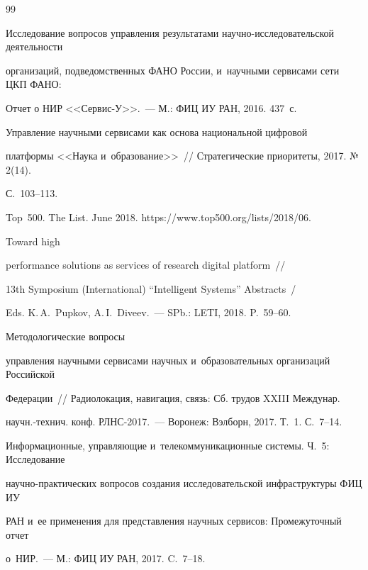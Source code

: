 {{\begin{thebibliography}{99}

Исследование вопросов управления результатами научно-исследовательской деятельности 

организаций, подведомственных ФАНО России, и~научными сервисами сети ЦКП ФАНО: 

Отчет о НИР <<Сервис-У>>.~--- М.: ФИЦ ИУ РАН, 2016. 437~с.


 Управление научными сервисами как основа национальной цифровой 

платформы <<Наука и~образование>>~/\!\!/ Стратегические приоритеты, 2017. №\,2(14). 

С.~103--113.


Top~500. The List. June 2018. {\sf https://www.top500.org/lists/2018/06}.


 Toward high 

performance solutions as services of research digital platform~/\!\!/ 

13th Symposium (International) ``Intelligent Systems'' Abstracts~/

Eds. K.\,A.~Pupkov, A.\,I.~Diveev.~--- SPb.: LETI, 2018.  P.~59--60.






 Методологические вопросы 

управления научными сервисами научных и~образовательных организаций Российской 

Федерации~/\!\!/ Радиолокация, навигация, связь: Сб. трудов XXIII Междунар.  

научн.-технич. конф. РЛНС-2017.~--- Воронеж: Вэлборн, 2017. Т.~1. С.~7--14.


Информационные, управляющие и~телекоммуникационные системы. Ч.~5: Исследование 

научно-практических вопросов создания исследовательской инфраструктуры ФИЦ ИУ 

РАН и~ее применения для представления научных сервисов: Промежуточный отчет 

о~НИР.~--- М.: ФИЦ ИУ РАН, 2017. C.~7--18.





        \end{thebibliography}

} }
